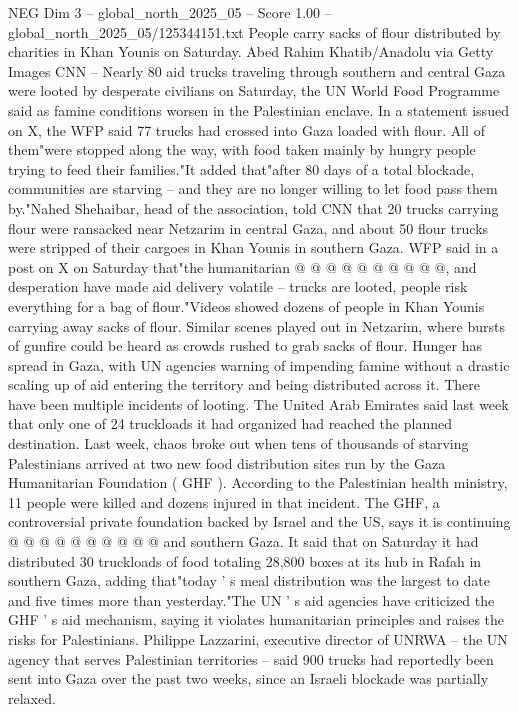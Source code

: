 \begin{textsample}{NEG Dim 3 – global\_north\_2025\_05 – Score 1.00 – global\_north\_2025\_05/125344151.txt}  \label{ex:f3_neg_327}
People carry sacks of flour distributed by charities in Khan Younis on Saturday.
Abed Rahim Khatib/Anadolu via Getty Images CNN -- Nearly 80 aid trucks traveling through southern and central Gaza were looted by desperate civilians on Saturday, the UN World Food Programme said as famine conditions worsen in the Palestinian enclave.
In a statement issued on X, the WFP said 77 trucks had crossed into Gaza loaded with flour.
All of them"were stopped along the way, with food taken mainly by hungry people trying to feed their families."It added that"after 80 days of a total blockade, communities are starving -- and they are no longer willing to let food pass them by."Nahed Shehaibar, head of the association, told CNN that 20 trucks carrying flour were ransacked near Netzarim in central Gaza, and about 50 flour trucks were stripped of their cargoes in Khan Younis in southern Gaza.
WFP said in a post on X on Saturday that"the humanitarian @ @ @ @ @ @ @ @ @ @, and desperation have made aid delivery volatile -- trucks are looted, people risk everything for a bag of flour."Videos showed dozens of people in Khan Younis carrying away sacks of flour.
Similar scenes played out in Netzarim, where bursts of gunfire could be heard as crowds rushed to grab sacks of flour.
Hunger has spread in Gaza, with UN agencies warning of impending famine without a drastic scaling up of aid entering the territory and being distributed across it.
There have been multiple incidents of looting.
The United Arab Emirates said last week that only one of 24 truckloads it had organized had reached the planned destination.
Last week, chaos broke out when tens of thousands of starving Palestinians arrived at two new food distribution sites run by the Gaza Humanitarian Foundation ( GHF ).
According to the Palestinian health ministry, 11 people were killed and dozens injured in that incident.
The GHF, a controversial private foundation backed by Israel and the US, says it is continuing @ @ @ @ @ @ @ @ @ @ and southern Gaza.
It said that on Saturday it had distributed 30 truckloads of food totaling 28,800 boxes at its hub in Rafah in southern Gaza, adding that"today ' s meal distribution was the largest to date and five times more than yesterday."The UN ' s aid agencies have criticized the GHF ' s aid mechanism, saying it violates humanitarian principles and raises the risks for Palestinians.
Philippe Lazzarini, executive director of UNRWA -- the UN agency that serves Palestinian territories -- said 900 trucks had reportedly been sent into Gaza over the past two weeks, since an Israeli blockade was partially relaxed.

\end{textsample}
